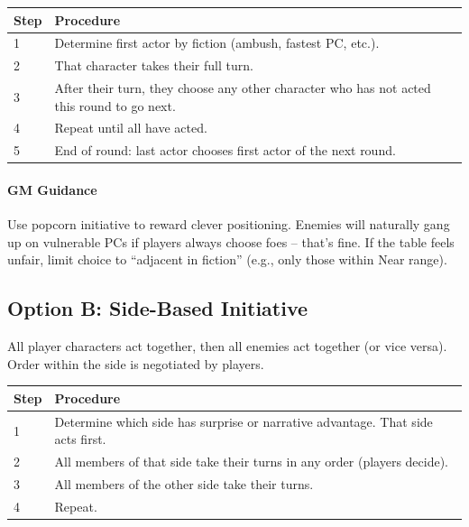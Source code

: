 \begin{table}[h]
\centering
\small
\begin{tabularx}{\textwidth}{lX}
\toprule
\textbf{Step} & \textbf{Procedure} \\
\midrule
1 & Determine first actor by fiction (ambush, fastest PC, etc.). \\
2 & That character takes their full turn. \\
3 & After their turn, they choose any other character who has not acted this round to go next. \\
4 & Repeat until all have acted. \\
5 & End of round: last actor chooses first actor of the next round. \\
\bottomrule
\end{tabularx}
\end{table}

\paragraph{GM Guidance}
Use popcorn initiative to reward clever positioning. Enemies will naturally gang up on vulnerable PCs if players always choose foes – that’s fine. If the table feels unfair, limit choice to “adjacent in fiction” (e.g., only those within Near range).

\subsection{Option B: Side-Based Initiative}
\label{subsec:side-initiative}
All player characters act together, then all enemies act together (or vice versa). Order within the side is negotiated by players.

\begin{table}[h]
\centering
\small
\begin{tabularx}{\textwidth}{lX}
\toprule
\textbf{Step} & \textbf{Procedure} \\
\midrule
1 & Determine which side has surprise or narrative advantage. That side acts first. \\
2 & All members of that side take their turns in any order (players decide). \\
3 & All members of the other side take their turns. \\
4 & Repeat. \\
\bottomrule
\end{tabularx}
\end{table}

